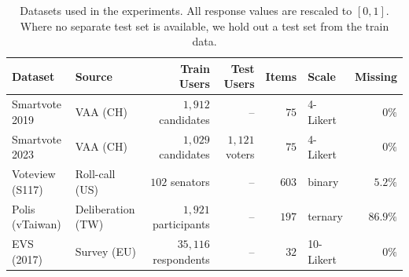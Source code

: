 \begin{table}[ht]
\setlength{\tabcolsep}{5pt}
\centering
\caption{Datasets used in the experiments. All response values are rescaled to $[0, 1]$. Where no separate test set is available, we hold out a test set from the train data.}
\label{tab:datasets}
\small
\begin{tabular}{llrrrlr}
\toprule
Dataset & Source & Train Users & Test Users & Items & Scale & Missing \\
\midrule
Smartvote 2019 & VAA (CH) & $1{,}912$ candidates & -- & $75$ & 4-Likert & $0\%$ \\
Smartvote 2023 & VAA (CH) & $1{,}029$ candidates & $1{,}121$ voters & $75$ & 4-Likert & $0\%$ \\
Voteview (S117) & Roll-call (US) & $102$ senators & -- & $603$ & binary & $5.2\%$ \\
Polis (vTaiwan) & Deliberation (TW) & $1{,}921$ participants & -- & $197$ & ternary & $86.9\%$ \\
EVS (2017) & Survey (EU) & $35{,}116$ respondents & -- & $32$ & 10-Likert & $0\%$ \\
\bottomrule
\end{tabular}
\end{table}